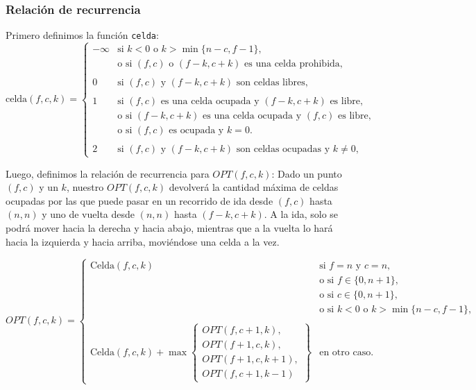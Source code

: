 \subsubsection{Relación de recurrencia}

Primero definimos la función \texttt{celda}:
\[
	\text{celda}(f, c, k) =
	\begin{cases}
		-\infty & \text{si } k < 0 \text{ o } k > \min\{n - c, f - 1\},                            \\
		        & \text{o si } (f, c) \text{ o } (f-k, c+k) \text{ es una celda prohibida},        \\ \\
		0       & \text{si } (f, c) \text{ y } (f-k, c+k) \text{ son celdas libres},               \\  \\
		1       & \text{si } (f, c) \text{ es una celda ocupada y } (f-k, c+k) \text{ es libre},   \\
		        & \text{o si } (f-k, c+k) \text{ es una celda ocupada y } (f, c) \text{ es libre}, \\
		        & \text{o si } (f, c) \text{ es ocupada y } k = 0.                                 \\ \\
		2       & \text{si } (f, c) \text{ y } (f-k, c+k) \text{ son celdas ocupadas y } k \neq 0,
	\end{cases}
\]


Luego, definimos la relación de recurrencia para $OPT(f, c, k)$:
Dado un punto $(f, c)$ y un $k$, nuestro $OPT(f, c, k)$ devolverá la cantidad máxima de celdas ocupadas por las que puede pasar en un recorrido de ida desde $(f, c)$
hasta $(n, n)$ y uno de vuelta desde $(n, n)$ hasta $(f - k, c + k)$. A la ida, solo se podrá mover hacia la derecha y hacia abajo, mientras que a la vuelta lo hará
hacia la izquierda y hacia arriba, moviéndose una celda a la vez.

\[
OPT(f, c, k) =
\begin{cases}
\text{Celda}(f, c, k) & \text{si } f = n \text{ y } c = n, \\ 
                      & \text{o si } f \in \{0, n+1\}, \\ 
                      & \text{o si } c \in \{0, n+1\}, \\ 
                      & \text{o si } k < 0 \text{ o } k > \min\{n - c, f - 1\}, \\ \\ 
\text{Celda}(f, c, k) + \max\left\{ 
\begin{array}{l}
OPT(f, c+1, k), \\ 
OPT(f+1, c, k), \\ 
OPT(f+1, c, k+1), \\ 
OPT(f, c+1, k-1) 
\end{array} 
\right\} & \text{en otro caso}.
\end{cases}
\]